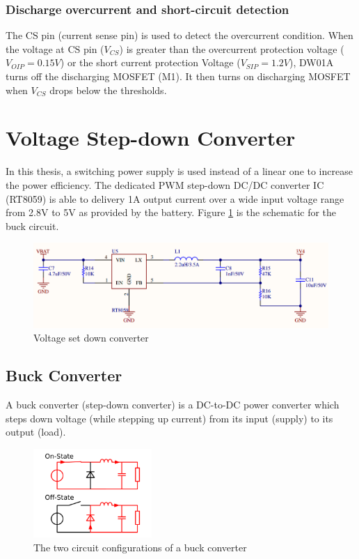 \documentclass[\main/thesis.tex]{subfiles}
\begin{document}
\subsubsection{Discharge overcurrent and short-circuit detection}
The CS pin (current sense pin) is used to detect the overcurrent condition. When the voltage at CS pin ($V_{CS}$) is greater than the overcurrent protection voltage ($V_{OIP} = 0.15V$) or the short current protection Voltage ($V_{SIP} = 1.2V$), DW01A turns off the discharging MOSFET (M1). It then turns on discharging MOSFET when $V_{CS}$ drops below the thresholds.

\section{Voltage Step-down Converter}
In this thesis, a switching power supply is used instead of a linear one to increase the power efficiency. The dedicated PWM step-down DC/DC converter IC (RT8059) is able to delivery 1A output current over a wide input voltage range from 2.8V to 5V as provided by the battery. Figure \ref{fig:voltage_set_down_converter} is the schematic for the buck circuit.
\begin{figure}[H]
    \begin{center}
        \includegraphics[width=1\textwidth]{voltage_set_down_converter.png}
    \end{center}
    \caption{Voltage set down converter}
    \label{fig:voltage_set_down_converter}
\end{figure}
\subsection{Buck Converter}
A buck converter (step-down converter) is a DC-to-DC power converter which steps down voltage (while stepping up current) from its input (supply) to its output (load).

\begin{figure}[H]
    \begin{center}
        \includegraphics[width=0.4\textwidth]{buck_converter.png}
    \end{center}
    \caption{The two circuit configurations of a buck converter}
    \label{fig:buck_converter}
\end{figure}
\end{document}
